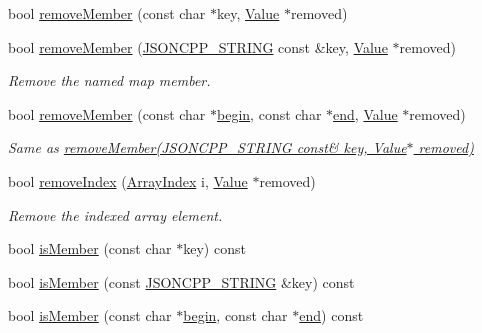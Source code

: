 \begin{DoxyCompactItemize}
\item 
bool \hyperlink{class_json_1_1_value_a708e599489adf30d65bf85a8ee16e6fb}{remove\+Member} (const char $\ast$key, \hyperlink{class_json_1_1_value}{Value} $\ast$removed)
\item 
bool \hyperlink{class_json_1_1_value_ae385ecef98427970df525ee876e9f54a}{remove\+Member} (\hyperlink{config_8h_a1e723f95759de062585bc4a8fd3fa4be}{J\+S\+O\+N\+C\+P\+P\+\_\+\+S\+T\+R\+I\+NG} const \&key, \hyperlink{class_json_1_1_value}{Value} $\ast$removed)
\begin{DoxyCompactList}\small\item\em Remove the named map member. \end{DoxyCompactList}\item 
bool \hyperlink{class_json_1_1_value_a49c91af727d6b4eb0af02a81bb2def87}{remove\+Member} (const char $\ast$\hyperlink{class_json_1_1_value_a015459a3950c198d63a2d3be8f5ae296}{begin}, const char $\ast$\hyperlink{class_json_1_1_value_a3e443cd0ef24f7e028b175e47ee045e0}{end}, \hyperlink{class_json_1_1_value}{Value} $\ast$removed)
\begin{DoxyCompactList}\small\item\em Same as \hyperlink{class_json_1_1_value_ae385ecef98427970df525ee876e9f54a}{remove\+Member(\+J\+S\+O\+N\+C\+P\+P\+\_\+\+S\+T\+R\+I\+N\+G const\& key, Value$\ast$ removed)} \end{DoxyCompactList}\item 
bool \hyperlink{class_json_1_1_value_ae9e67e08a85a2f3be3396ec0f4c47f65}{remove\+Index} (\hyperlink{class_json_1_1_value_a184a91566cccca7b819240f0d5561c7d}{Array\+Index} i, \hyperlink{class_json_1_1_value}{Value} $\ast$removed)
\begin{DoxyCompactList}\small\item\em Remove the indexed array element. \end{DoxyCompactList}\item 
bool \hyperlink{class_json_1_1_value_ad6d4df2227321bab05e86667609a7fad}{is\+Member} (const char $\ast$key) const
\item 
bool \hyperlink{class_json_1_1_value_a0c2cd838217b23ee6bde8135de1b30d9}{is\+Member} (const \hyperlink{config_8h_a1e723f95759de062585bc4a8fd3fa4be}{J\+S\+O\+N\+C\+P\+P\+\_\+\+S\+T\+R\+I\+NG} \&key) const
\item 
bool \hyperlink{class_json_1_1_value_a2007e1e51f21f44ecf1f13e4a1c567b9}{is\+Member} (const char $\ast$\hyperlink{class_json_1_1_value_a015459a3950c198d63a2d3be8f5ae296}{begin}, const char $\ast$\hyperlink{class_json_1_1_value_a3e443cd0ef24f7e028b175e47ee045e0}{end}) const

\end{DoxyCompactItemize}
